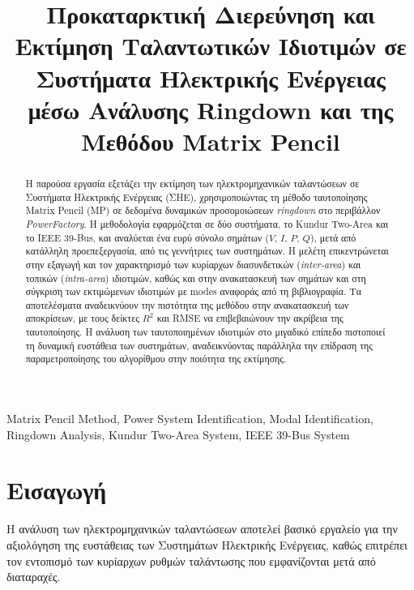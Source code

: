 \documentclass[conference]{IEEEtran}
\begin{document}
\title{Προκαταρκτική Διερεύνηση και Εκτίμηση Ταλαντωτικών Ιδιοτιμών σε Συστήματα Ηλεκτρικής Ενέργειας μέσω Ανάλυσης Ringdown και της Μεθόδου Matrix Pencil}

\author{
    \and
}
\maketitle

\begin{abstract}
Η παρούσα εργασία εξετάζει την εκτίμηση των ηλεκτρομηχανικών ταλαντώσεων σε Συστήματα Ηλεκτρικής Ενέργειας (ΣΗΕ), χρησιμοποιώντας τη μέθοδο ταυτοποίησης Matrix Pencil (MP) σε δεδομένα δυναμικών προσομοιώσεων \textit{ringdown} στο περιβάλλον \textit{PowerFactory}. Η μεθοδολογία εφαρμόζεται σε δύο συστήματα, το Kundur Two-Area και το IEEE 39-Bus, και αναλύεται ένα ευρύ σύνολο σημάτων ($V$, $I$, $P$, $Q$), μετά από κατάλληλη προεπεξεργασία, από τις γεννήτριες των συστημάτων. Η μελέτη επικεντρώνεται στην εξαγωγή και τον χαρακτηρισμό των κυρίαρχων διασυνδετικών (\textit{inter-area}) και τοπικών (\textit{intra-area}) ιδιοτιμών, καθώς και στην ανακατασκευή των σημάτων και στη σύγκριση των εκτιμώμενων ιδιοτιμών με modes αναφοράς από τη βιβλιογραφία. Τα αποτελέσματα αναδεικνύουν την πιστότητα της μεθόδου στην ανακατασκευή των αποκρίσεων, με τους δείκτες $R^2$ και RMSE να επιβεβαιώνουν την ακρίβεια της ταυτοποίησης. Η ανάλυση των ταυτοποιημένων ιδιοτιμών στο μιγαδικό επίπεδο πιστοποιεί τη δυναμική ευστάθεια των συστημάτων, αναδεικνύοντας παράλληλα την επίδραση της παραμετροποίησης του αλγορίθμου στην ποιότητα της εκτίμησης.
\end{abstract}

\begin{IEEEkeywords}
Matrix Pencil Method, Power System Identification, Modal Identification, Ringdown Analysis, Kundur Two-Area System, IEEE 39-Bus System
\end{IEEEkeywords}

\section{Εισαγωγή}
Η ανάλυση των ηλεκτρομηχανικών ταλαντώσεων αποτελεί βασικό εργαλείο για την αξιολόγηση της ευστάθειας των Συστημάτων Ηλεκτρικής Ενέργειας, καθώς επιτρέπει τον εντοπισμό των κυρίαρχων ρυθμών ταλάντωσης που εμφανίζονται μετά από διαταραχές.
\end{document}
